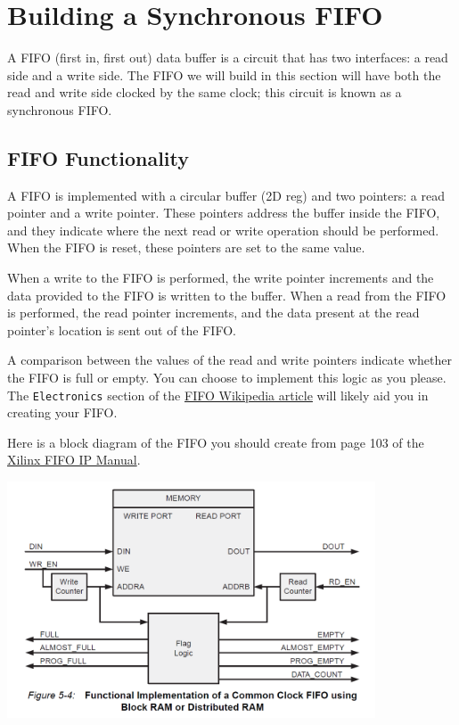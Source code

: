 \documentclass[11pt]{article}
\begin{document}
\section{Building a Synchronous FIFO}
A FIFO (first in, first out) data buffer is a circuit that has two interfaces: a read side and a write side. The FIFO we will build in this section will have both the read and write side clocked by the same clock; this circuit is known as a synchronous FIFO.

\subsection{FIFO Functionality}
A FIFO is implemented with a circular buffer (2D reg) and two pointers: a read pointer and a write pointer. These pointers address the buffer inside the FIFO, and they indicate where the next read or write operation should be performed. When the FIFO is reset, these pointers are set to the same value. 

When a write to the FIFO is performed, the write pointer increments and the data provided to the FIFO is written to the buffer. When a read from the FIFO is performed, the read pointer increments, and the data present at the read pointer's location is sent out of the FIFO.

A comparison between the values of the read and write pointers indicate whether the FIFO is full or empty. You can choose to implement this logic as you please. The \verb|Electronics| section of the \href{https://en.wikipedia.org/wiki/FIFO_(computing_and_electronics)}{FIFO Wikipedia article} will likely aid you in creating your FIFO.

Here is a block diagram of the FIFO you should create from page 103 of the \href{https://www.xilinx.com/support/documentation/ip_documentation/fifo_generator_ug175.pdf}{Xilinx FIFO IP Manual}.

\begin{center}
	\includegraphics[height=7cm]{sync_fifo_diagram.png}
\end{center}
\end{document}
